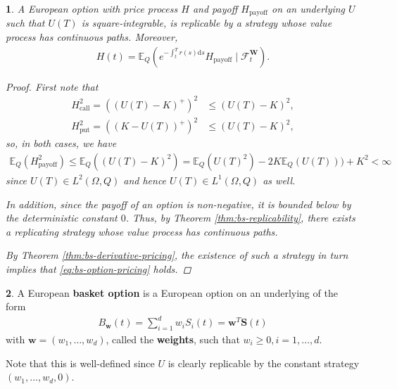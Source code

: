 \documentclass[english]{article}
\numberwithin{equation}{section}
\numberwithin{figure}{section}
\theoremstyle{bolddescit}
\newtheorem{theorem}{\protect\theoremname}[section]
\theoremstyle{definition}
\newtheorem{definition}[theorem]{\protect\definitionname}
\theoremstyle{definition}
\theoremstyle{plain}
\theoremstyle{plain}
\theoremstyle{bolddesc}
\theoremstyle{plain}
\theoremstyle{remark}
\providecommand{\definitionname}{Definition}
\providecommand{\theoremname}{Theorem}
\begin{document}
\begin{theorem}\label{thm:bs-option-pricing}
  A European option with price process $H$ and payoff $H_\text{payoff}$ on an underlying $U$ such that $U(T)$ is square-integrable, is replicable by a strategy whose value process has continuous paths. Moreover,
  \begin{align}\label{eq:bs-option-pricing}
    H(t) = \mathbb{E}_Q\left(e^{-\int_t^T r(s) \mathrm{d}s} H_\text{payoff} \mid \mathcal{F}^\mathbf{W}_t\right).
  \end{align}

  \begin{proof}
    First note that
    \begin{align*}
      H_\text{call}^2 = ((U(T) - K)^+)^2 &\le (U(T) - K)^2,\\
      H_\text{put}^2 = ((K - U(T))^+)^2 &\le (U(T) - K)^2,
    \end{align*}
    so, in both cases, we have
    \begin{align*}
      \mathbb{E}_Q(H_\text{payoff}^2)
      \le \mathbb{E}_Q((U(T) - K)^2)
      = \mathbb{E}_Q(U(T)^2) - 2K\mathbb{E}_Q(U(T))) + K^2
      < \infty
    \end{align*}
    since $U(T) \in L^2(\Omega, Q)$ and hence $U(T) \in L^1(\Omega, Q)$ as well.

    In addition, since the payoff of an option is non-negative, it is bounded below by the deterministic constant $0$. Thus, by Theorem \ref{thm:bs-replicability}, there exists a replicating strategy whose value process has continuous paths.

    By Theorem \ref{thm:bs-derivative-pricing}, the existence of such a strategy in turn implies that \eqref{eq:bs-option-pricing} holds.
  \end{proof}
\end{theorem}

\begin{definition}
  A European \textbf{basket option} is a European option on an underlying of the form
  \begin{align*}
    B_\mathbf{w}(t) = \sum_{i=1}^{d} w_i S_i(t) = \mathbf{w}^T \mathbf{S}(t)
  \end{align*}
  with $\mathbf{w} = (w_1, \ldots, w_d)$, called the \textbf{weights}, such that $w_i \ge 0, i=1,\ldots,d$.
\end{definition}

Note that this is well-defined since $U$ is clearly replicable by the constant strategy $(w_1, \ldots, w_d, 0)$.
\end{document}
